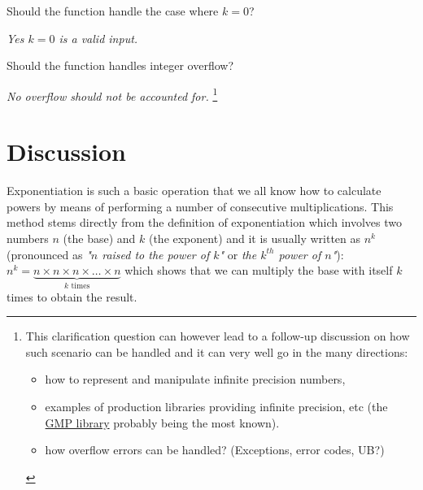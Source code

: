 \begin{QandA}
    \item Should the function handle the case where $k=0$?
    \begin{answered}
        \textit{Yes $k=0$ is a valid input.}
    \end{answered}
    
    \item Should the function handles integer overflow?
    \begin{answered}
        \textit{No overflow should not be accounted for. }\footnote{
            This clarification question can however lead to a follow-up discussion on how such scenario can be handled and it can very well go in the many directions: 
            \begin{itemize}
                \item how to represent and manipulate infinite precision numbers,
                \item examples of production libraries providing infinite precision, etc (the \href{https://gmplib.org/}{GMP library}\cite{cit::web::gmplibrary} probably being the most known).
                \item how overflow errors can be handled? (Exceptions, error codes, UB?)
            \end{itemize}
            }
    \end{answered}
        
\end{QandA}

\section{Discussion}
\label{exponentiation:sec:discussion}
Exponentiation is such a basic operation that we all know how to calculate powers by means of performing a number of consecutive multiplications. 
This method stems  directly from the definition of exponentiation which involves two numbers $n$ (the base) and $k$ (the exponent) and it is usually written as $n^k$ (pronounced as \textit{"$n$ raised to the power of $k$"} or \textit{the ${k^{th}}$ power of $n$"}):
$n^k = \underbrace{n \times n \times n \times \ldots \times n}_{k \text{ times}}$ which shows that 
we can multiply the base with itself $k$ times to obtain the result. 

